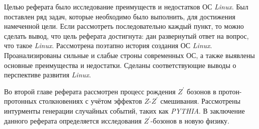 Целью реферата было исследование преимуществ и недостатков ОС \textit{Linux}. Был поставлен ряд задач, которые необходимо было выполнить, для достижения намеченной цели. Если рассмотреть последовательно каждый пункт, то можно сделать вывод, что цель реферата достигнута: дан развернутый ответ на вопрос, что такое \textit{Linux}. Рассмотрена поэтапно история создания ОС \textit{Linux}. Проанализированы сильные и слабые строны современных ОС, а также выявлены основные преимущества и недостатки. Сделаны соответствующие выводы о перспективе развития \textit{Linux}.

Во второй главе реферата рассмотрен процесс рождения $Z^\prime$ бозонов в протон-протонных столкновениях с учётом эффектов $Z$-$Z^\prime$ смешивания. Рассмотрены интурменты генерации случайных событий, таких как \textit{PYTHIA}. В заключение данного реферата определяется исследования $Z^\prime$-бозонов в новую физику.
